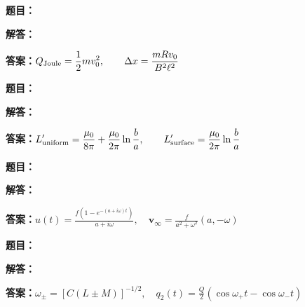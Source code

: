 \documentclass[lang=cn,color=blue,11pt]{elegantbook}
\begin{document}
\par
\noindent\textbf{题目：}
\par\noindent\textbf{解答：}
\par\noindent\textbf{答案：}\(\displaystyle Q_{\rm Joule}=\frac12mv_0^2,\qquad \Delta x=\frac{mRv_0}{B^2\ell^2}\)\par
\par\smallskip\noindent\hrulefill\par\medskip
{}\par
\noindent\textbf{题目：}
\par\noindent\textbf{解答：}
\par\noindent\textbf{答案：}\(\displaystyle L'_{\rm uniform}=\frac{\mu_0}{8\pi}+\frac{\mu_0}{2\pi}\ln\frac ba,\qquad L'_{\rm surface}=\frac{\mu_0}{2\pi}\ln\frac ba\)\par
\par\smallskip\noindent\hrulefill\par\medskip
{}\par
\noindent\textbf{题目：}
\par\noindent\textbf{解答：}
\par\noindent\textbf{答案：}\(\displaystyle u(t)=\frac{f(1-e^{-(a+i\omega)t})}{a+i\omega},\quad \boldsymbol v_\infty=\frac f{a^2+\omega^2}(a,-\omega)\)\par
\par\smallskip\noindent\hrulefill\par\medskip
{}\par
\noindent\textbf{题目：}
\par\noindent\textbf{解答：}
\par\noindent\textbf{答案：}\(\displaystyle \omega_\pm=[C(L\pm M)]^{-1/2},\quad q_2(t)=\frac Q2(\cos\omega_+t-\cos\omega_-t)\)\par
\par\smallskip\noindent\hrulefill\par\medskip
\end{document}
